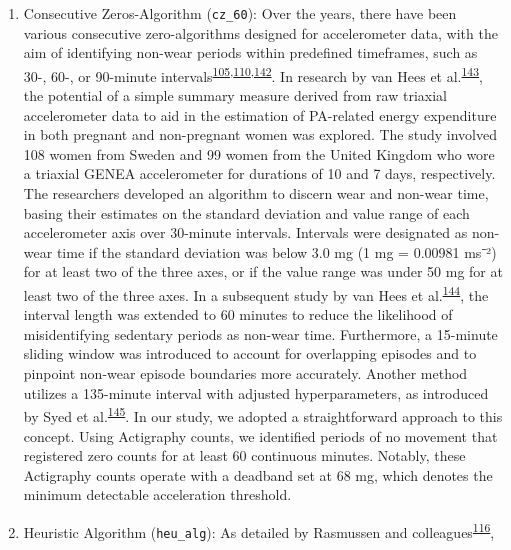 \documentclass[
  10pt,
]{scrbook}
\begin{document}
\begin{enumerate}
\def\labelenumi{\arabic{enumi}.}
\item
  Consecutive Zeros-Algorithm (\texttt{cz\_60}): Over the years, there
  have been various consecutive zero-algorithms designed for
  accelerometer data, with the aim of identifying non-wear periods
  within predefined timeframes, such as 30-, 60-, or 90-minute
  intervals\textsuperscript{\protect\hyperlink{ref-choi_validation_2011}{105},\protect\hyperlink{ref-hecht_methodology_2009}{110},\protect\hyperlink{ref-troiano_physical_2008}{142}}.
  In research by van Hees et
  al.\textsuperscript{\protect\hyperlink{ref-van_hees_estimation_2011}{143}},
  the potential of a simple summary measure derived from raw triaxial
  accelerometer data to aid in the estimation of PA-related energy
  expenditure in both pregnant and non-pregnant women was explored. The
  study involved 108 women from Sweden and 99 women from the United
  Kingdom who wore a triaxial GENEA accelerometer for durations of 10
  and 7 days, respectively. The researchers developed an algorithm to
  discern wear and non-wear time, basing their estimates on the standard
  deviation and value range of each accelerometer axis over 30-minute
  intervals. Intervals were designated as non-wear time if the standard
  deviation was below 3.0 mg (1 mg = 0.00981 ms⁻²) for at least two of
  the three axes, or if the value range was under 50 mg for at least two
  of the three axes. In a subsequent study by van Hees et
  al.\textsuperscript{\protect\hyperlink{ref-hees_separating_2013}{144}},
  the interval length was extended to 60 minutes to reduce the
  likelihood of misidentifying sedentary periods as non-wear time.
  Furthermore, a 15-minute sliding window was introduced to account for
  overlapping episodes and to pinpoint non-wear episode boundaries more
  accurately. Another method utilizes a 135-minute interval with
  adjusted hyperparameters, as introduced by Syed et
  al.\textsuperscript{\protect\hyperlink{ref-syed_evaluating_2020}{145}}.
  In our study, we adopted a straightforward approach to this concept.
  Using Actigraphy counts, we identified periods of no movement that
  registered zero counts for at least 60 continuous minutes. Notably,
  these Actigraphy counts operate with a deadband set at 68 mg, which
  denotes the minimum detectable acceleration threshold.
\item
  Heuristic Algorithm (\texttt{heu\_alg}): As detailed by Rasmussen and
  colleagues\textsuperscript{\protect\hyperlink{ref-rasmussen_short-term_2020}{116}},

\end{enumerate}
\end{document}
